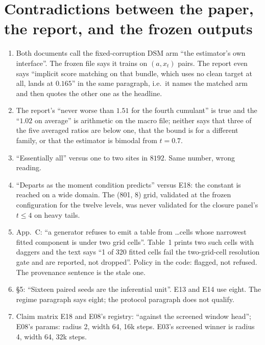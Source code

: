 \section{Contradictions between the paper, the report, and the frozen outputs}
\label{sec:contra}

\begin{enumerate}
\item {} Both documents call the fixed-corruption DSM arm ``the estimator's own interface''. The frozen file says it trains on $(a,x_t)$ pairs. The report even says ``implicit score matching on that bundle, which uses no clean target at all, lands at $0.165$'' in the same paragraph, i.e.\ it names the matched arm and then quotes the other one as the headline.
\item {} The report's ``never worse than $1.51$ for the fourth cumulant'' is true and the ``$1.02$ on average'' is arithmetic on the macro file; neither says that three of the five averaged ratios are below one, that the bound is for a different family, or that the estimator is bimodal from $t=0.7$.
\item {} ``Essentially all'' versus one to two sites in $8192$. Same number, wrong reading.
\item {} ``Departs as the moment condition predicts'' versus E18: the constant is reached on a wide domain. The (801, 8) grid, validated at the frozen configuration for the twelve levels, was never validated for the closure panel's $t\le4$ on heavy tails.
\item {} App.~C: ``a generator refuses to emit a table from \ldots cells whose narrowest fitted component is under two grid cells''. Table~1 prints two such cells with daggers and the text says ``1 of 320 fitted cells fail the two-grid-cell resolution gate and are reported, not dropped''. Policy in the code: flagged, not refused. The provenance sentence is the stale one.
\item {} \S5: ``Sixteen paired seeds are the inferential unit''. E13 and E14 use eight. The regime paragraph says eight; the protocol paragraph does not qualify.
\item {} Claim matrix E18 and E08's registry: ``against the screened window head''; E08's params: radius 2, width 64, 16k steps. E03's screened winner is radius 4, width 64, 32k steps.

\end{enumerate}
